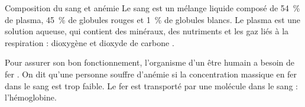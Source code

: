 \smallskip


\begin{doc}{Composition du sang et anémie}%
  Le sang est un mélange liquide composé de \qty{54}{\percent} de plasma, \qty{45}{\percent} de globules rouges et \qty{1}{\percent} de globules blancs. 
  Le plasma est une solution aqueuse, qui contient des minéraux,
  des nutriments et les gaz liés à la respiration :
  dioxygène  et dioxyde de carbone .
  
  Pour assurer son bon fonctionnement, l'organisme d'un être humain a besoin de fer .
  On dit qu'une personne souffre d'anémie si la concentration massique en fer dans le sang est trop faible.
  Le fer est transporté par une molécule dans le sang : l'hémoglobine.
    
    
\end{doc}

%

